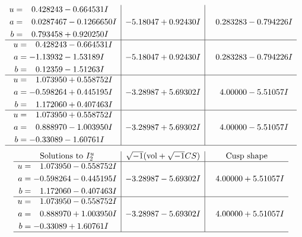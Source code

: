 \documentclass[1p]{elsarticle_modified}
\theoremstyle{definition}
\newcommand{\I}{\sqrt{-1}}
\begin{document}
$$\begin{array}{c|c|c}
\begin{aligned}
u &= \phantom{-}0.428243 - 0.664531 I \\
a &= \phantom{-}0.0287467 - 0.1266650 I \\
b &= \phantom{-}0.793458 + 0.920250 I\end{aligned}
 & -5.18047 + 0.92430 I & \phantom{-}0.283283 - 0.794226 I \\ \hline\begin{aligned}
u &= \phantom{-}0.428243 - 0.664531 I \\
a &= -1.13932 - 1.53189 I \\
b &= \phantom{-}0.12359 - 1.51263 I\end{aligned}
 & -5.18047 + 0.92430 I & \phantom{-}0.283283 - 0.794226 I \\ \hline\begin{aligned}
u &= \phantom{-}1.073950 + 0.558752 I \\
a &= -0.598264 + 0.445195 I \\
b &= \phantom{-}1.172060 + 0.407463 I\end{aligned}
 & -3.28987 + 5.69302 I & \phantom{-}4.00000 - 5.51057 I \\ \hline\begin{aligned}
u &= \phantom{-}1.073950 + 0.558752 I \\
a &= \phantom{-}0.888970 - 1.003950 I \\
b &= -0.33089 - 1.60761 I\end{aligned}
 & -3.28987 + 5.69302 I & \phantom{-}4.00000 - 5.51057 I\\
 \hline 
 \end{array}$$\newpage$$\begin{array}{c|c|c}  
\text{Solutions to }I^u_{2}& \I (\text{vol} + \sqrt{-1}CS) & \text{Cusp shape}\\
 \hline 
\begin{aligned}
u &= \phantom{-}1.073950 - 0.558752 I \\
a &= -0.598264 - 0.445195 I \\
b &= \phantom{-}1.172060 - 0.407463 I\end{aligned}
 & -3.28987 - 5.69302 I & \phantom{-}4.00000 + 5.51057 I \\ \hline\begin{aligned}
u &= \phantom{-}1.073950 - 0.558752 I \\
a &= \phantom{-}0.888970 + 1.003950 I \\
b &= -0.33089 + 1.60761 I\end{aligned}
 & -3.28987 - 5.69302 I & \phantom{-}4.00000 + 5.51057 I\\
 \hline 
 \end{array}$$\newpage\newpage\renewcommand{\arraystretch}{1}
\end{document}
